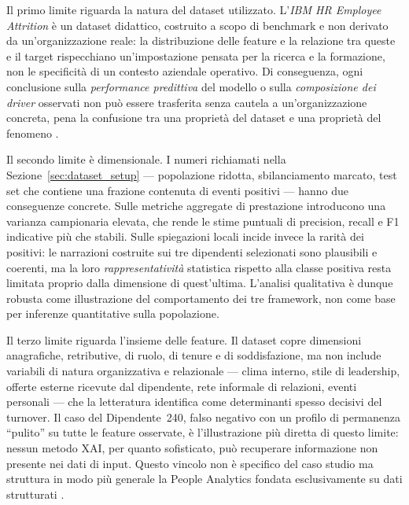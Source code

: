 Il primo limite riguarda la natura del dataset utilizzato. L'\emph{IBM HR Employee Attrition} è un dataset didattico, costruito a scopo di benchmark e non derivato da un'organizzazione reale: la distribuzione delle feature e la relazione tra queste e il target rispecchiano un'impostazione pensata per la ricerca e la formazione, non le specificità di un contesto aziendale operativo. Di conseguenza, ogni conclusione sulla \emph{performance predittiva} del modello o sulla \emph{composizione dei driver} osservati non può essere trasferita senza cautela a un'organizzazione concreta, pena la confusione tra una proprietà del dataset e una proprietà del fenomeno \cite{IBMHRDataset}.

Il secondo limite è dimensionale. I numeri richiamati nella Sezione~\ref{sec:dataset_setup} --- popolazione ridotta, sbilanciamento marcato, test set che contiene una frazione contenuta di eventi positivi --- hanno due conseguenze concrete. Sulle metriche aggregate di prestazione introducono una varianza campionaria elevata, che rende le stime puntuali di precision, recall e F1 indicative più che stabili. Sulle spiegazioni locali incide invece la rarità dei positivi: le narrazioni costruite sui tre dipendenti selezionati sono plausibili e coerenti, ma la loro \emph{rappresentatività} statistica rispetto alla classe positiva resta limitata proprio dalla dimensione di quest'ultima. L'analisi qualitativa è dunque robusta come illustrazione del comportamento dei tre framework, non come base per inferenze quantitative sulla popolazione.

Il terzo limite riguarda l'insieme delle feature. Il dataset copre dimensioni anagrafiche, retributive, di ruolo, di tenure e di soddisfazione, ma non include variabili di natura organizzativa e relazionale --- clima interno, stile di leadership, offerte esterne ricevute dal dipendente, rete informale di relazioni, eventi personali --- che la letteratura identifica come determinanti spesso decisivi del turnover. Il caso del Dipendente~240, falso negativo con un profilo di permanenza ``pulito'' su tutte le feature osservate, è l'illustrazione più diretta di questo limite: nessun metodo XAI, per quanto sofisticato, può recuperare informazione non presente nei dati di input. Questo vincolo non è specifico del caso studio ma struttura in modo più generale la People Analytics fondata esclusivamente su dati strutturati \cite{Isson_Harriott_2016}.

